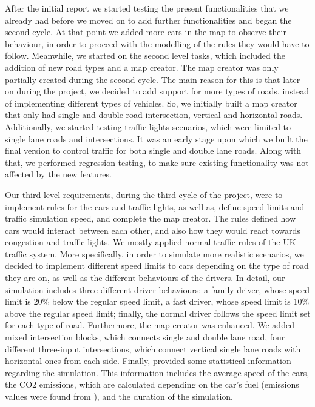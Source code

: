 \documentclass[oneside]{article}
\begin{document}
\noindent After the initial report we started testing the present functionalities that we already had before we moved on to add further functionalities and began the second cycle. At that point we added more cars in the map to observe their behaviour, in order to proceed with the modelling of the rules they would have to follow. Meanwhile, we started on the second level tasks, which included the addition of new road types and a map creator. The map creator was only partially created during the second cycle. The main reason for this is that later on during the project, we decided to add support for more types of roads, instead of implementing different types of vehicles. So, we initially built a map creator that only had single and double road intersection, vertical and horizontal roads. Additionally, we started testing traffic lights scenarios, which were limited to single lane roads and intersections. It was an early stage upon which we built the final version to control traffic for both single and double lane roads. Along with that, we performed regression testing, to make sure existing functionality was not affected by the new features.
\newline

\noindent Our third level requirements, during the third cycle of the project, were to implement rules for the cars and traffic lights, as well as, define speed limits and traffic simulation speed, and complete the map creator. The rules defined how cars would interact between each other, and also how they would react towards congestion and traffic lights. We mostly applied normal traffic rules of the UK traffic system. More specifically, in order to simulate more realistic scenarios, we decided to implement different speed limits to cars depending on the type of road they are on, as well as the different behaviours of the drivers. In detail, our simulation includes three different driver behaviours: a family driver, whose speed limit is 20\% below the regular speed limit, a fast driver, whose speed limit is 10\% above the regular speed limit; finally, the normal driver follows the speed limit set for each type of road. Furthermore, the map creator was enhanced. We added mixed intersection blocks, which connects single and double lane road, four different three-input intersections, which connect vertical single lane roads with horizontal ones from each side. Finally, provided some statistical information regarding the simulation. This information includes the average speed of the cars, the CO2 emissions, which are calculated depending on the car's fuel (emissions values were found from \cite{co2}), and the duration of the simulation. \\
\end{document}
